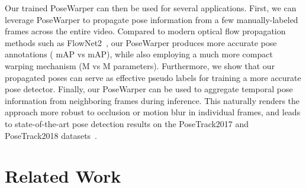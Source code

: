 \documentclass{article}
\begin{document}
Our trained PoseWarper can then be used for several applications. First, we can leverage PoseWarper to propagate pose information from a few manually-labeled frames across the entire video. Compared to modern optical flow propagation methods such as FlowNet2~\cite{DBLP:journals/corr/IlgMSKDB16}, our PoseWarper produces more accurate pose annotations ( mAP vs  mAP), while also employing a much more compact warping mechanism (M vs M parameters). Furthermore, we show that our propagated poses can serve as effective pseudo labels for training a more accurate pose detector. Finally, our PoseWarper can be used to aggregate temporal pose information from neighboring frames during inference. This naturally renders the approach more robust to occlusion or motion blur in individual frames, and leads to state-of-the-art pose detection results on the PoseTrack2017 and PoseTrack2018 datasets~\cite{Iqbal_CVPR2017}. 





 



\section{Related Work}
\end{document}
